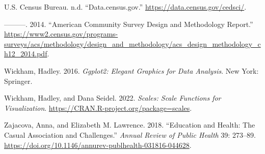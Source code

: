 \documentclass[
  letterpaper,
  DIV=11,
  numbers=noendperiod]{scrartcl}
\newlength{\cslhangindent}
\newenvironment{CSLReferences}[2] %
 {\begin{list}{}{%
  \setlength{\itemindent}{0pt}
  \setlength{\leftmargin}{0pt}
  \setlength{\parsep}{0pt}
  \ifodd #1
   \setlength{\leftmargin}{\cslhangindent}
   \setlength{\itemindent}{-1\cslhangindent}
  \fi
  \setlength{\itemsep}{#2\baselineskip}}}
 {\end{list}}
\begin{document}
\begin{CSLReferences}{1}{0}
U.S. Census Bureau. n.d. {``Data.census.gov.''}
\url{https://data.census.gov/cedsci/}.

---------. 2014. {``American Community Survey Design and Methodology
Report.''}
\url{https://www2.census.gov/programs-surveys/acs/methodology/design_and_methodology/acs_design_methodology_ch12_2014.pdf}.

Wickham, Hadley. 2016. \emph{Ggplot2: Elegant Graphics for Data
Analysis}. New York: Springer.

Wickham, Hadley, and Dana Seidel. 2022. \emph{Scales: Scale Functions
for Visualization}. \url{https://CRAN.R-project.org/package=scales}.

Zajacova, Anna, and Elizabeth M. Lawrence. 2018. {``Education and
Health: The Casual Association and Challenges.''} \emph{Annual Review of
Public Health} 39: 273--89.
\url{https://doi.org/10.1146/annurev-publhealth-031816-044628}.

\end{CSLReferences}
\end{document}
